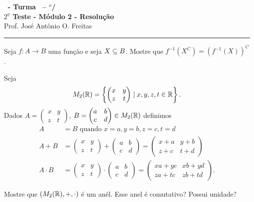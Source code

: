 \documentclass[12pt]{exam}
\begin{document}
\begin{center}
{\Large\bf \disciplina\ - Turma \turma\ -- \semestre$^{o}$/\ano} \\ \vspace{9pt} {\large\bf
$2^{\underline{o}}$ Teste - M\'odulo 2 - Resolu\c{c}\~ao}\\
\vspace{9pt} Prof. Jos{\'e} Ant{\^o}nio O. Freitas
\end{center}
\hrule

\vspace{.6cm}

\questao Seja $f : A \to B$ uma fun{\c c}{\~a}o e seja $X \subseteq B$. Mostre que $f^{-1}(X^C) = (f^{-1}(X))^C$.

\vspace{.5cm}

\questao Seja
\[
    M_2(\mathbb{R}) = \left\{\begin{pmatrix}
        x & y\\z & t 
    \end{pmatrix} \mid x, y, z, t \in \mathbb{R} \right\}.
\]
Dados $A = \begin{pmatrix}
        x & y\\z & t 
    \end{pmatrix}$, $B = \begin{pmatrix}
        a & b\\c & d 
    \end{pmatrix} \in M_2(\mathbb{R})$ definimos
\begin{align*}
    A &= B \mbox{ quando } x = a, y = b, z = c, t = d\\
    A + B &= \begin{pmatrix}
        x & y\\z & t 
    \end{pmatrix} + \begin{pmatrix}
        a & b\\c & d 
    \end{pmatrix} = \begin{pmatrix}
        x + a & y + b\\z + c & t + d 
    \end{pmatrix}\\
    A \cdot B &= \begin{pmatrix}
        x & y\\z & t 
    \end{pmatrix} \cdot \begin{pmatrix}
        a & b\\c & d 
    \end{pmatrix} = \begin{pmatrix}
        xa + yc & xb + yd\\za + tc & zb + td 
    \end{pmatrix}.
\end{align*}

Mostre que $(M_2(\mathbb{R}), + , \cdot)$ \'e um an\'el. Esse anel \'e comutativo? Possui unidade?
\end{document}
